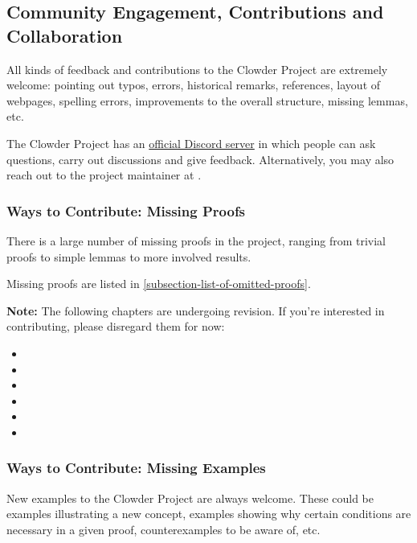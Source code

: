 \subsection{Community Engagement, Contributions and Collaboration}\label{subsection-community-engagement-contributions-and-collaboration}
All kinds of feedback and contributions to the Clowder Project are extremely welcome: pointing out typos, errors, historical remarks, references, layout of webpages, spelling errors, improvements to the overall structure, missing lemmas, etc.

The Clowder Project has an \href{https://discord.gg/b98uG2MWgc}{official Discord server} in which people can ask questions, carry out discussions and give feedback. Alternatively, you may also reach out to the project maintainer at \href{mailto:emily.de.oliveira.santos.tmf@gmail.com}{}.
\subsubsection{Ways to Contribute: Missing Proofs}\label{subsubsection-ways-to-contribute-missing-proofs}
There is a large number of missing proofs in the project, ranging from trivial proofs to simple lemmas to more involved results.

Missing proofs are listed in \cref{subsection-list-of-omitted-proofs}.

\textbf{Note: }The following chapters are undergoing revision. If you're interested in contributing, please disregard them for now:
\begin{itemize}
    \item \ChapterRelations
    \item \ChapterConstructionsWithRelations
    \item \ChapterConditionsOnRelations
    \item \ChapterCategories
    \item \ChapterConstructionsWithMonoidalCategories
    \item \ChapterTypesOfMorphismsInBicategories
\end{itemize}
\subsubsection{Ways to Contribute: Missing Examples}\label{subsubsection-ways-to-contribute-missing-examples}
New examples to the Clowder Project are always welcome. These could be examples illustrating a new concept, examples showing why certain conditions are necessary in a given proof, counterexamples to be aware of, etc.

